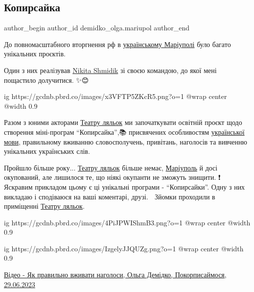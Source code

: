  
 
 
 
 

\subsection{Копирсайка}
\label{sec:29_06_2023.fb.demidko_olga.mariupol.1.kopirsajka}

\ifcmt
 author_begin
   author_id demidko_olga.mariupol
 author_end
\fi

До повномасштабного вторгнення рф в \href{\urlMariupolMyrnyyIA}{українському Маріуполі} було багато унікальних проєктів.  

Один з них реалізував \href{https://www.facebook.com/nikita.shmidik}{Nikita Shmidik} зі своєю командою, до якої мені пощастило долучитися. ✨️😊

\ifcmt
  ig https://gcdnb.pbrd.co/images/x3VFTP5ZKcR5.png?o=1
  @wrap center
  @width 0.9
\fi

Разом з юними акторами \href{\urlTeatrKukolMariupolIA}{Театру ляльок} ми започаткувати  освітній проєкт щодо
створення міні-програм \enquote{Копирсайка},📚 присвячених особливостям \href{\urlUkrainskaMovaIA}{української
мови}, правильному вживанню словосполучень, привітань, наголосів та вивченню
унікальних українських слів. 

Пройшло більше року... \href{\urlTeatrKukolMariupolIA}{Театру ляльок} більше немає, \href{\urlMariupolIA}{Маріуполь} й досі окупований,
але лишилося те, що ніякі окупанти не зможуть знищити. ❗️ Яскравим прикладом
цьому є ці унікальні програми - \enquote{Копирсайки}. Одну з них викладаю і сподіваюся
на ваші коментарі, друзі. 🙏 Зйомки проходили в приміщенні \href{\urlTeatrKukolMariupolIA}{Театру ляльок}.

\ifcmt
  ig https://gcdnb.pbrd.co/images/4PiJPWIShmB3.png?o=1
  @wrap center
  @width 0.9
\fi

\ifcmt
  ig https://gcdnb.pbrd.co/images/IzgelyJJQUZg.png?o=1
  @wrap center
  @width 0.9
\fi

\href{https://archive.org/details/video.29_06_2023.demidko_olga.pokorpysajmosja.jak_pravylno_vzhyvaty_nagolosy}{%
Відео - Як правильно вживати наголоси, Ольга Демідко, Покорписаймося, 29.06.2023%
}


